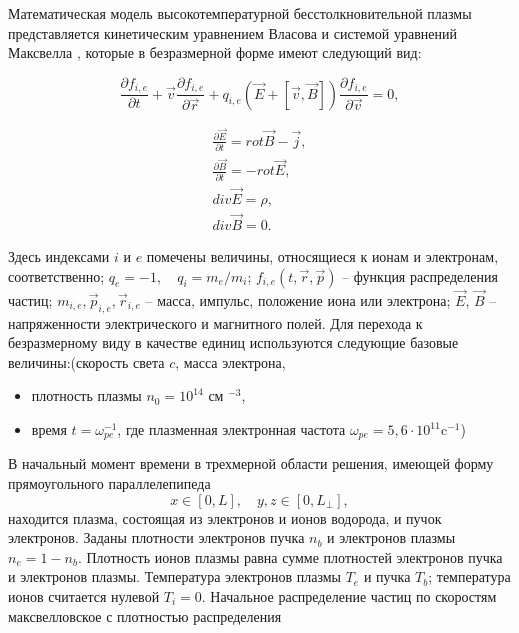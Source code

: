 Математическая модель высокотемпературной бесстолкновительной плазмы
представляется кинетическим уравнением Власова и системой
уравнений Максвелла \cite{VshivkovPICbook,birdsall2004plasma}, которые в безразмерной форме имеют
следующий вид:

\begin{equation}\label{eq:Vlas}
\frac{\partial f_{i,e}}{\partial t}+{\vec{v}} \frac{\partial f_{i,e}}{\partial \vec{r}}+q_{i,e}({\vec{E}}+[{\vec{v}},{\vec{B}}])\frac{\partial f_{i,e}}{\partial \vec{v}}=0, 
\end{equation}

\begin{eqnarray}
& \frac{\partial \vec{E}}{\partial t}=rot \vec{B} - \vec{j}, & \label{eq:dE}
\\
& \frac{\partial \vec{B}}{\partial t}=-rot \vec{E}, & \label{eq:dB}
\\
& div \vec{E} = \rho, & \label{eq:divE}
\\
& div \vec{B} = 0. & \label{eq:divB}
\end{eqnarray}

Здесь индексами $i$ и $e$ помечены величины, относящиеся к ионам и
электронам, со\-от\-ветст\-вен\-но; $q_e=-1, \quad q_i=m_e/m_i$; $f_{i,e}(t,\vec{r},\vec{p})$ --
функция распределения частиц; $m_{i,e}, \vec{p}_{i,e},
\vec{r}_{i,e}$ -- масса, импульс, положение иона или электрона;
$\vec{E}$, $\vec{B}$ -- напряженности электрического и магнитного
полей. Для перехода к безразмерному виду в качестве единиц
используются следующие базовые величины:(скорость света $c$, масса электрона,
\begin{itemize}
\item плотность плазмы $n_0=10^{14}$ см $^{-3}$,
\item время $t=\omega _{pe}^{-1}$, где плазменная электронная частота $\omega_{pe} =5,6 \cdot 10^{11}$c$^{-1}$)
\end{itemize}

%
%
% 	


В начальный момент времени в трехмерной области
решения, имеющей форму прямоугольного параллелепипеда $$
x\in[0,L],\quad y,z\in[0,L_\bot], $$ находится плазма, состоящая из
электронов и ионов водорода, и пучок электронов. Заданы плотности электронов пучка $n_b$ и электронов плазмы $n_e = 1-n_b$. Плотность ионов плазмы равна сумме плотностей электронов пучка и электронов плазмы. Температура электронов плазмы $T_e$ и пучка $T_b$; температура ионов считается нулевой $T_i=0$. Начальное распределение частиц по скоростям макс\-вел\-ловс\-кое с плотностью распределения

